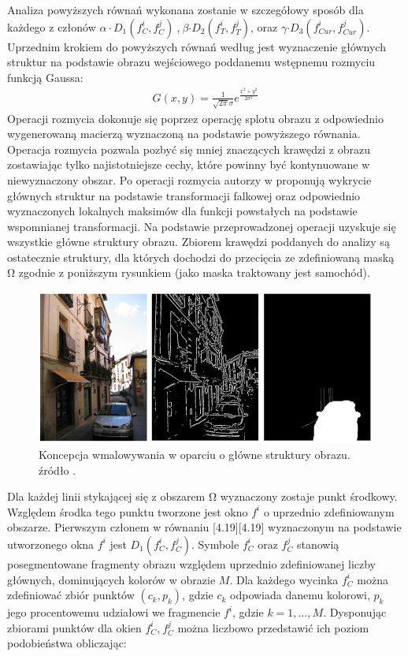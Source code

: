 \documentclass[12pt, twoside, openany]{report}
\theoremstyle{definition}
\begin{document}
Analiza powyższych równań wykonana zostanie w szczegółowy sposób dla każdego z członów $\alpha \cdot D_1\left(f^i_C,f^j_C\right)\ $,$\ \beta {\cdot D}_2\left(f^i_T,f^j_T\right)$, oraz $\gamma {\cdot D}_3\left(f^i_{Cur},f^j_{Cur}\right)$. Uprzednim krokiem do powyższych równań według \cite{SalientStrucTexProp} jest wyznaczenie głównych struktur na podstawie obrazu wejściowego poddanemu wstępnemu rozmyciu funkcją Gaussa:
\begin{align}
G\left(x,y\right)=\frac{1}{\sqrt{2\pi }\sigma }e^{\frac{x^2+y^2}{2{\sigma }^2}}
\label{rozmycieGaussa}
\end{align}
Operacji rozmycia dokonuje się poprzez operację splotu obrazu z odpowiednio wygenerowaną macierzą wyznaczoną na podstawie powyższego równania. Operacja rozmycia pozwala pozbyć się mniej znaczących krawędzi z obrazu zostawiając tylko najistotniejsze cechy, które powinny być kontynuowane w niewyznaczony obszar. Po operacji rozmycia autorzy w \cite{SalientStrucTexProp} proponują wykrycie głównych struktur na podstawie transformacji falkowej oraz odpowiednio wyznaczonych lokalnych maksimów dla funkcji powstałych na podstawie wspomnianej transformacji. Na podstawie przeprowadzonej operacji uzyskuje się wszystkie główne struktury obrazu. Zbiorem krawędzi poddanych do analizy są ostatecznie struktury, dla których dochodzi do przecięcia ze zdefiniowaną maską $\mathrm{\Omega }$ zgodnie z poniższym rysunkiem (jako maska traktowany jest samochód).
\begin{figure}[!h]
	\centering
	\includegraphics[scale=0.8]{rysunki/4_fig5}
	\caption{Koncepcja wmalowywania w oparciu o główne struktury obrazu. źródło \cite{StructurePropagationManual}.}
	\label{4_fig5} 
\end{figure}
Dla każdej linii stykającej się z obszarem $\mathrm{\Omega }$ wyznaczony zostaje punkt środkowy. Względem środka tego punktu tworzone jest okno  $f^i$ o uprzednio zdefiniowanym obszarze. Pierwszym członem w równaniu [4.19][4.19] wyznaczonym na podstawie utworzonego okna $f^i$ jest $D_1\left(f^i_C,f^j_C\right)$. Symbole $f^i_C$ oraz $f^j_C$ stanowią posegmentowane fragmenty obrazu względem uprzednio zdefiniowanej liczby głównych, dominujących kolorów w obrazie $M$. Dla każdego wycinka $f^i_C$ można zdefiniować zbiór punktów $(c_k,p_k)$, gdzie $c_k$ odpowiada danemu kolorowi, $p_k$ jego procentowemu udziałowi we fragmencie $f^i$, gdzie $k=1,\dots ,M$. Dysponując zbiorami punktów dla okien $f^i_C$,$\ f^j_C$ można liczbowo przedstawić ich poziom podobieństwa obliczając: 
\end{document}
